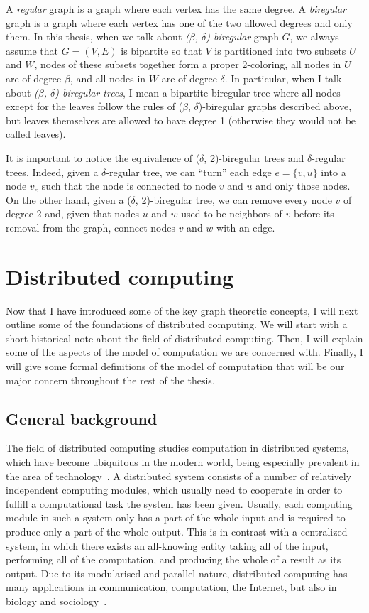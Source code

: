 A \emph{regular} graph is a graph where each vertex has the same degree.
A \emph{biregular} graph is a graph where each vertex has one of the two
allowed degrees and only them. In this thesis, when we talk about
\emph{($\beta$, $\delta$)-biregular} graph $G$, we always assume that 
$G = (V, E)$ is bipartite so that $V$ is partitioned into two
subsets $U$ and $W$, nodes of these subsets together form a proper 2-coloring,
all nodes in $U$ are of degree $\beta$, and all nodes in $W$ are of
degree $\delta$. In particular, when I talk about \emph{($\beta$, $\delta$)-biregular trees},
I mean a bipartite biregular tree where all nodes except for the leaves
follow the rules of ($\beta$, $\delta$)-biregular graphs described above,
but leaves themselves are allowed to have degree 1 (otherwise they would not be
called leaves).

It is important to notice the equivalence of ($\delta$, 2)-biregular trees
and $\delta$-regular trees. Indeed, given a $\delta$-regular tree, we can
``turn'' each edge $e = \{v, u\}$ into a node $v_e$ such that the node is
connected to node $v$ and $u$ and only those nodes. On the other hand,
given a ($\delta$, 2)-biregular tree, we can remove every node $v$ of degree
2 and, given that nodes $u$ and $w$ used to be neighbors of $v$ before its
removal from the graph, connect nodes $v$ and $w$ with an edge.

\section{Distributed computing}

Now that I have introduced some of the key graph theoretic concepts, I will
next outline some of the foundations of distributed computing. We will start with
a short historical note about the field of distributed computing. Then, I will
explain some of the aspects of the model of computation we are concerned with. Finally, 
I will give some formal definitions of the model of computation that will be our
major concern throughout the rest of the thesis.

\subsection{General background}

The field of distributed computing studies computation in distributed systems, which
have become ubiquitous in the modern world, being especially prevalent
in the area of technology~\cite{Attiya2004}.
A distributed system consists of a number of relatively independent
computing modules, which usually need to cooperate in order to
fulfill a computational task the system has been given. Usually,
each computing module in such a system only has a part of the whole
input and is required to produce only a part of the whole output.
This is in contrast with a centralized system, in which there 
exists an all-knowing entity taking all of the input, performing all
of the computation, and producing the whole of a result as its output.
Due to its modularised and parallel nature, distributed computing
has many applications in communication, computation, the Internet,
but also in biology and sociology~\cite{Wattenhofer2016}.

